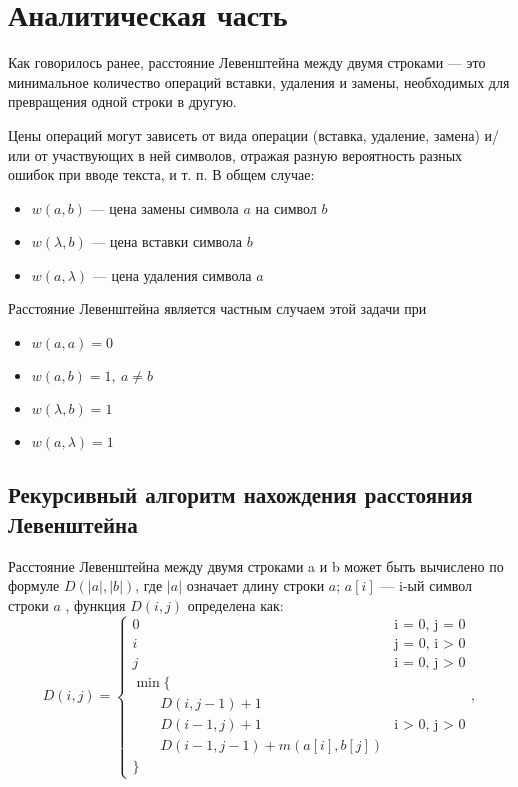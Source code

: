 \chapter{Аналитическая часть}

Как говорилось ранее, расстояние Левенштейна между двумя строками — это минимальное количество операций вставки, удаления и замены, необходимых для превращения одной строки в другую.

Цены операций могут зависеть от вида операции (вставка, удаление, замена) и/или от участвующих в ней символов, отражая разную вероятность разных ошибок при вводе текста, и т. п. В общем случае:
\begin{itemize}
	\item $w(a,b)$ — цена замены символа $a$ на символ $b$
	\item $w(\lambda,b)$ — цена вставки символа $b$
	\item $w(a,\lambda)$ — цена удаления символа $a$
\end{itemize}
Расстояние Левенштейна является частным случаем этой задачи \cite{ifmo} при
\begin{itemize}
	\item $w(a,a)=0$
	\item $w(a,b)=1, \medspace a \neq b$
	\item $w(\lambda,b)=1$
	\item $w(a,\lambda)=1$
\end{itemize}

\section{Рекурсивный алгоритм нахождения расстояния Левенштейна}

Расстояние Левенштейна между двумя строками a и b может быть вычислено по формуле $D(|a|, |b|)$, где $|a|$ означает длину строки $a$; $a[i]$ — i-ый символ строки $a$ , функция $D(i, j)$ определена как:
\begin{equation}
	\label{eq:D}
	D(i, j) = \begin{cases}
		0 &\text{i = 0, j = 0}\\
		i &\text{j = 0, i > 0}\\
		j &\text{i = 0, j > 0}\\
		\min \lbrace \\
			\qquad D(i, j-1) + 1\\
			\qquad D(i-1, j) + 1 &\text{i > 0, j > 0}\\
			\qquad D(i-1, j-1) + m(a[i], b[j])\\
		\rbrace
	\end{cases},
\end{equation}

